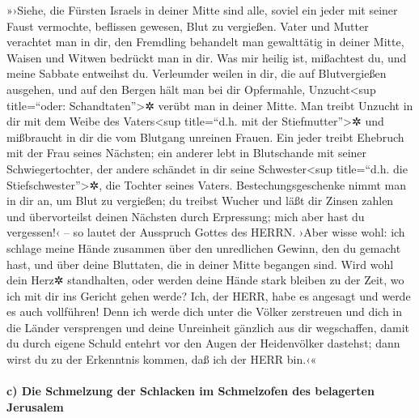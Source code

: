 »›Siehe, die Fürsten Israels in deiner Mitte sind alle,
soviel ein jeder mit seiner Faust vermochte, beflissen gewesen, Blut zu
vergießen. Vater und Mutter verachtet man in dir, den
Fremdling behandelt man gewalttätig in deiner Mitte, Waisen und Witwen
bedrückt man in dir. Was mir heilig ist, mißachtest du,
und meine Sabbate entweihst du. Verleumder weilen in dir,
die auf Blutvergießen ausgehen, und auf den Bergen hält man bei dir
Opfermahle, Unzucht\textless sup title=``oder:
Schandtaten''\textgreater✲ verübt man in deiner Mitte.
Man treibt Unzucht in dir mit dem Weibe des
Vaters\textless sup title=``d.h. mit der Stiefmutter''\textgreater✲ und
mißbraucht in dir die vom Blutgang unreinen Frauen. Ein
jeder treibt Ehebruch mit der Frau seines Nächsten; ein anderer lebt in
Blutschande mit seiner Schwiegertochter, der andere schändet in dir
seine Schwester\textless sup title=``d.h. die
Stiefschwester''\textgreater✲, die Tochter seines Vaters.
Bestechungsgeschenke nimmt man in dir an, um Blut zu
vergießen; du treibst Wucher und läßt dir Zinsen zahlen und
übervorteilst deinen Nächsten durch Erpressung; mich aber hast du
vergessen!‹ -- so lautet der Ausspruch Gottes des HERRN.
›Aber wisse wohl: ich schlage meine Hände zusammen über
den unredlichen Gewinn, den du gemacht hast, und über deine Bluttaten,
die in deiner Mitte begangen sind. Wird wohl dein Herz✲
standhalten, oder werden deine Hände stark bleiben zu der Zeit, wo ich
mit dir ins Gericht gehen werde? Ich, der HERR, habe es angesagt und
werde es auch vollführen! Denn ich werde dich unter die
Völker zerstreuen und dich in die Länder versprengen und deine
Unreinheit gänzlich aus dir wegschaffen, damit du durch
eigene Schuld entehrt vor den Augen der Heidenvölker dastehst; dann
wirst du zu der Erkenntnis kommen, daß ich der HERR bin.‹«

\hypertarget{c-die-schmelzung-der-schlacken-im-schmelzofen-des-belagerten-jerusalem}{%
\paragraph{c) Die Schmelzung der Schlacken im Schmelzofen des belagerten
Jerusalem}\label{c-die-schmelzung-der-schlacken-im-schmelzofen-des-belagerten-jerusalem}}

